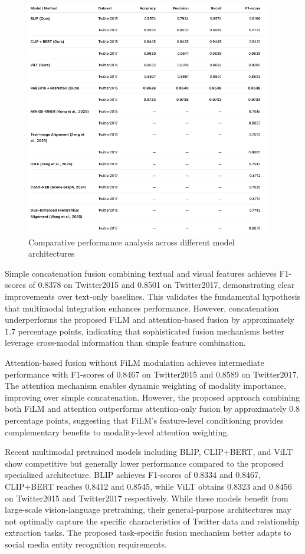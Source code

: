 \documentclass[12pt,a4paper]{report}
\begin{document}
\begin{figure}[H]
\centering
\includegraphics[width=0.95\textwidth]{comparison .png}
\caption{Comparative performance analysis across different model architectures}
\label{fig:comparison}
\end{figure}

Simple concatenation fusion combining textual and visual features achieves F1-scores of 0.8378 on Twitter2015 and 0.8501 on Twitter2017, demonstrating clear improvements over text-only baselines. This validates the fundamental hypothesis that multimodal integration enhances performance. However, concatenation underperforms the proposed FiLM and attention-based fusion by approximately 1.7 percentage points, indicating that sophisticated fusion mechanisms better leverage cross-modal information than simple feature combination.

Attention-based fusion without FiLM modulation achieves intermediate performance with F1-scores of 0.8467 on Twitter2015 and 0.8589 on Twitter2017. The attention mechanism enables dynamic weighting of modality importance, improving over simple concatenation. However, the proposed approach combining both FiLM and attention outperforms attention-only fusion by approximately 0.8 percentage points, suggesting that FiLM's feature-level conditioning provides complementary benefits to modality-level attention weighting.

Recent multimodal pretrained models including BLIP, CLIP+BERT, and ViLT show competitive but generally lower performance compared to the proposed specialized architecture. BLIP achieves F1-scores of 0.8334 and 0.8467, CLIP+BERT reaches 0.8412 and 0.8545, while ViLT obtains 0.8323 and 0.8456 on Twitter2015 and Twitter2017 respectively. While these models benefit from large-scale vision-language pretraining, their general-purpose architectures may not optimally capture the specific characteristics of Twitter data and relationship extraction tasks. The proposed task-specific fusion mechanism better adapts to social media entity recognition requirements.
\end{document}
